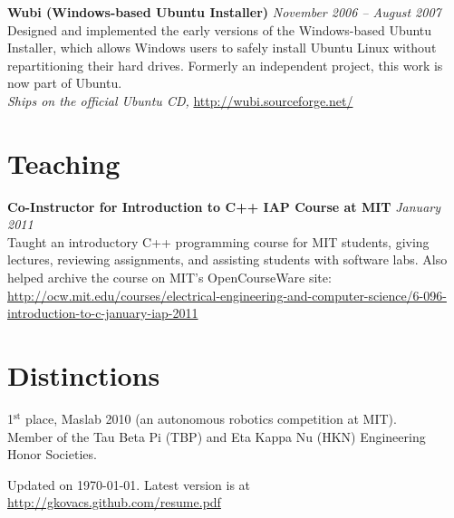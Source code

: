 \documentclass[margin,line]{resume}
\begin{document}
\begin{resume}
\textbf{Wubi (Windows-based Ubuntu Installer)} \hfill \textsl{November 2006 -- August 2007}\\
Designed and implemented the early versions of the Windows-based Ubuntu Installer, which allows Windows users to safely install Ubuntu Linux without repartitioning their hard drives. Formerly an independent project, this work is now part of Ubuntu. \\
\emph{Ships on the official Ubuntu CD,} \url{http://wubi.sourceforge.net/}

\section{\mysidestyle Teaching}

\textbf{Co-Instructor for Introduction to C++ IAP Course at MIT} \hfill \textsl{January 2011}\\
Taught an introductory C++ programming course for MIT students, giving lectures, reviewing assignments, and assisting students with software labs. Also helped archive the course on MIT's OpenCourseWare site:\\
\url{http://ocw.mit.edu/courses/electrical-engineering-and-computer-science/6-096-introduction-to-c-january-iap-2011}



\section{\mysidestyle Distinctions}

1$^{\textrm{st}}$ place, Maslab 2010 (an autonomous robotics competition at MIT). \\
Member of the Tau Beta Pi (TBP) and Eta Kappa Nu (HKN) Engineering Honor Societies.

\vspace{10mm}

\begin{small}
\begin{center}
Updated on \today. Latest version is at \url{http://gkovacs.github.com/resume.pdf}
\end{center}
\end{small}

\end{resume}
\end{document}
